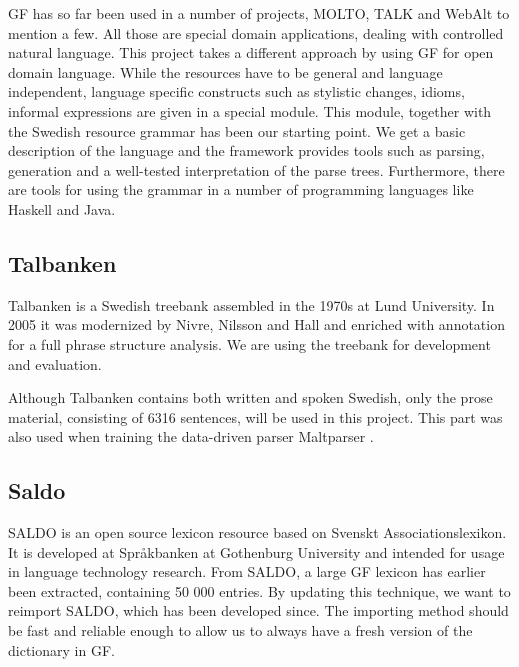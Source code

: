 \documentclass[submission]{eptcs} %
\begin{document}
GF has so far been used in a number of projects, MOLTO\cite{molto}, TALK\cite{talk}
and WebAlt\cite{webalt} to mention a few. 
All those are special domain applications, dealing with controlled natural
language.
This project takes a different approach by using GF for open domain language.
While the resources have to be general and language independent,
language specific constructs such as stylistic changes, idioms, informal
expressions are given in a special module.
This module, together with the Swedish resource grammar has been our starting
point. %
We get a basic description of the language and the framework provides
tools such as parsing, generation and
a well-tested interpretation of the parse trees. Furthermore, there are tools
for using the grammar in a number of programming languages like Haskell
and Java. 



\subsection{Talbanken}
Talbanken\cite{talbanken} is
a Swedish treebank assembled in the 1970s at Lund University.
In 2005 it was modernized by Nivre, Nilsson and Hall\cite{talbanken05} and
enriched with annotation for a full phrase structure analysis. 
We are using the treebank for development and evaluation. 

Although Talbanken contains both written and spoken Swedish,
only the prose material, consisting of 6316 sentences, will be used in this project.
This part was also used when training the data-driven parser Maltparser \cite{malt}. \\

\subsection{Saldo}
SALDO\cite{saldo} is an open source lexicon resource
based on Svenskt Associationslexikon. It is
developed at Språkbanken at Gothenburg University
and intended for usage in language technology
research. 
From SALDO, a large GF lexicon has earlier been extracted,
containing 50 000 entries. By updating this technique, we want
to reimport SALDO, which has been developed since.
The importing method should be fast and reliable
enough to allow us to always have a fresh version of the dictionary
in GF.
\end{document}
